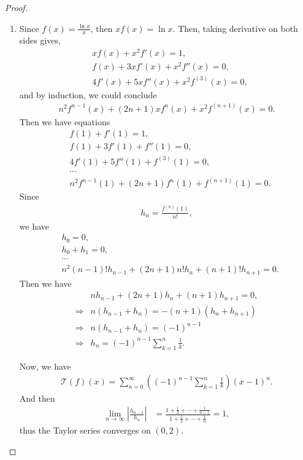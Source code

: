 \documentclass[11pt]{article}
\theoremstyle{definition}
\numberwithin{equation}{subsection}
\begin{document}
\begin{proof}
~\begin{enumerate}[label=(\alph*)]
    \item Since $f(x) = \frac{\ln x}{x}$, then $xf(x) = \ln x$. Then, taking derivative on both sides gives,
    \begin{align*}
        & xf(x) + x^2 f'(x) = 1, \\
        & f(x) + 3x f'(x) + x^2 f''(x) = 0, \\
        & 4f'(x) + 5x f''(x) + x^2 f^{(3)}(x) = 0,
    \end{align*}
    and by induction, we could conclude
    \begin{align*}
        n^2 f^{n-1}(x) + (2n + 1)x f^{n}(x) + x^2 f^{(n+1)}(x) = 0.
    \end{align*}
    Then we have equations
    \begin{align*}
        & f(1) + f'(1) = 1, \\
        & f(1) + 3f'(1) + f''(1) = 0, \\
        & 4f'(1) + 5f''(1) + f^{(3)}(1) = 0, \\
        & \cdots \\
        & n^2 f^{n-1}(1) + (2n + 1) f^{n}(1) + f^{(n+1)}(1) = 0.
    \end{align*}
    Since 
    \begin{align*}
        h_n = \frac{f^{(n)}(1)}{n!},
    \end{align*}
    we have
    \begin{align*}
        & h_0 = 0, \\
        & h_0 + h_1 = 0, \\
        & \cdots \\
        & n^2 (n-1)! h_{n-1} + (2n + 1) n! h_n + (n + 1)! h_{n+1} = 0.
    \end{align*}
    Then we have
    \begin{align*}
        & n h_{n-1} + (2n + 1) h_n + (n + 1) h_{n+1} = 0, \\
        \Rightarrow & n (h_{n-1} + h_n) = - (n + 1) (h_n + h_{n+1}) \\
        \Rightarrow & n (h_{n-1} + h_n) = (-1)^{n-1} \\
        \Rightarrow & h_n = (-1)^{n-1} \sum^n_{k=1} \frac{1}{k}.
    \end{align*}
    
    Now, we have 
    \begin{align*}
        \mathcal{T}(f)(x) = \sum^\infty_{n = 0} \left( (-1)^{n-1} \sum^n_{k=1} \frac{1}{k} \right) (x - 1)^n.
    \end{align*}
    And then 
    \begin{align*}
        \lim_{n\to\infty} \left| \frac{h_{n-1}}{h_n} \right| & = \frac{1 + \frac{1}{2} + \cdots + \frac{1}{n-1}}{1 + \frac{1}{2} + \cdots + \frac{1}{n}} = 1, 
    \end{align*}
    thus the Taylor series converges on $(0,2)$.
    

\end{enumerate}
\end{proof}
\end{document}
